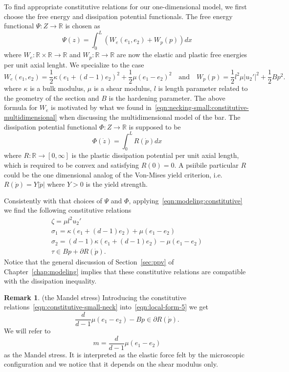 \documentclass[a4paper,10pt,twoside]{amsbook}
\numberwithin{section}{chapter}
\numberwithin{equation}{chapter}
\theoremstyle{definition}
\newtheorem{rmk}[prop]{Remark}
\begin{document}
To find appropriate constitutive relations for our one-dimensional model, we first choose the free energy and dissipation potential functionals. The free energy functional $\Psi\colon Z\to\mathbb{R}$ is chosen as
\[
\Psi(z)=\int_0^L\left(W_e(e_1,e_2)+W_p(p)\right)dx
\]
where $W_e\colon\mathbb{R}\times\mathbb{R}\to\mathbb{R}$ and $W_p\colon\mathbb{R}\to\mathbb{R}$ are now the elastic and plastic free energies per unit axial lenght. We specialize to the case
\begin{equation}
\label{eqn:necking-small:free-energy-density}
W_e(e_1,e_2)=\frac{1}{2}\kappa(e_1+(d-1)e_2)^2+\frac{1}{2}\mu(e_1-e_2)^2\quad\text{and}\quad W_p(p)=\frac{1}{2}l^2\mu|u_2'|^2+\frac{1}{2}Bp^2.
\end{equation}
where $\kappa$ is a bulk modulus, $\mu$ is a shear modulus, $l$ is length parameter related to the geometry of the section and $B$ is the hardening parameter. The above formula for $W_e$ is motivated by what we found in~\eqref{eqn:necking-small:constitutive-multidimensional} when discussing the multidimensional model of the bar. The dissipation potential functional $\Phi\colon Z\to\mathbb{R}$ is supposed to be
\begin{equation}
\label{eqn:necking-small:dissipation-potential-density}
\Phi(\dot z)=\int_0^LR(\dot p)dx
\end{equation}
where $R\colon\mathbb{R}\to[0,\infty]$ is the plastic dissipation potential per unit axial length, which is required to be convex and satisfying $R(0)=0$. A psiibile particular $R$ could be the one dimensional analog of the Von-Mises yield criterion, i.e.\ $R(\dot p)=Y|\dot p|$ where $Y>0$ is the yield strength.

Consistently with that choices of $\Psi$ and $\Phi$, applying~\eqref{eqn:modeling:constitutive} we find the following constitutive relations
\begin{subequations}
\label{eqn:constitutive-small-neck}
\begin{gather}
\zeta=\mu l^2u_2' \\
\sigma_1=\kappa(e_1+(d-1)e_2)+\mu(e_1-e_2) \\
\sigma_2=(d-1)\kappa(e_1+(d-1)e_2)-\mu(e_1-e_2) \\
\tau\in Bp+\partial R(\dot p).
\end{gather}
\end{subequations}
Notice that the general discussion of Section~\ref{sec:ppv} of Chapter~\ref{chap:modeling} implies that these constitutive relations are compatible with the dissipation inequality.
\begin{rmk}(the Mandel stress)
Introducing the constitutive relations~\eqref{eqn:constitutive-small-neck} into~\eqref{eqn:local-form-5} we get
\[
\frac{d}{d-1}\mu(e_1-e_2)-Bp\in\partial R(\dot p).
\]
We will refer to
\[
m=\frac{d}{d-1}\mu(e_1-e_2)
\]
as the Mandel stress. It is interpreted as the elastic force felt by the microscopic configuration and we notice that it depends on the shear modulus only.
\end{rmk}
\end{document}
